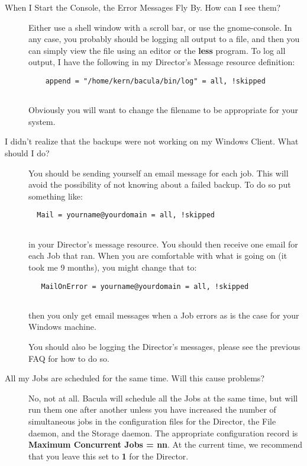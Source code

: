\begin{description}
\label{scroll}
\item [When I Start the Console, the Error Messages Fly By. How can I see
   them? ]
   Either use a shell window with a scroll bar, or use the gnome-console.  In any
   case, you probably should be logging all output to a file, and  then you can
   simply view the file using an editor or the {\bf less}  program. To log all
   output, I have the following in my Director's  Message resource definition:  

\footnotesize
\begin{verbatim}
    append = "/home/kern/bacula/bin/log" = all, !skipped
    
\end{verbatim}
\normalsize

Obviously you will want to change the filename to be appropriate  for your
system.  

\label{nobackup}
\item [I didn't realize that the backups were not working on my Windows 
   Client. What should I do? ]
You should be sending yourself an email message for each job. This will  avoid
the possibility of not knowing about a failed backup. To do so  put something
like:  

\footnotesize
\begin{verbatim}
  Mail = yourname@yourdomain = all, !skipped
  
\end{verbatim}
\normalsize

in your Director's message resource. You should then receive one  email for
each Job that ran. When you are comfortable with what  is going on (it took me
9 months), you might change that to:  

\footnotesize
\begin{verbatim}
   MailOnError = yourname@yourdomain = all, !skipped
   
\end{verbatim}
\normalsize

then you only get email messages when a Job errors as is the case  for your
Windows machine.  

You should also be logging the Director's messages, please see the  previous
FAQ for how to do so.  

\label{sched}
\item [All my Jobs are scheduled for the same time. Will this cause
   problems? ]
   No, not at all. Bacula will schedule all the Jobs at the same time,  but will
   run them one after another unless you have increased the number  of
   simultaneous jobs in the configuration files for the Director,  the File
   daemon, and the Storage daemon. The appropriate configuration  record is {\bf
   Maximum Concurrent Jobs = nn}. At the current time,  we recommend that you
   leave this set to {\bf 1} for the Director.  


\end{description}
